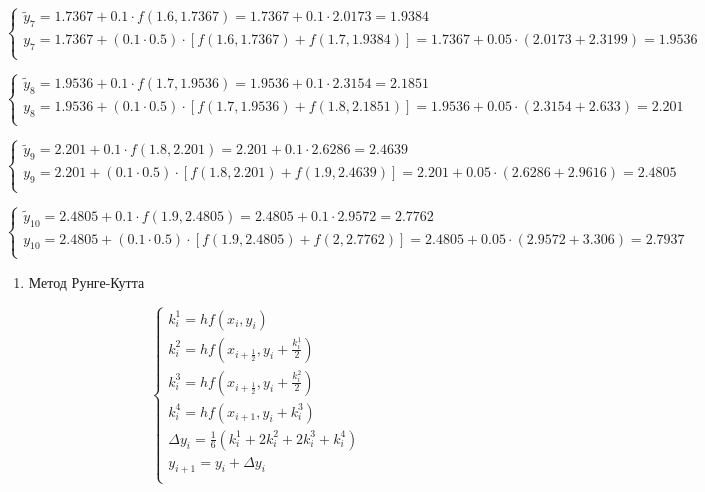 \documentclass[10pt, a4paper]{scrartcl}
\begin{document}
\(\displaystyle \begin{cases} \tilde{y}_{7} = 1.7367 + 0.1 \cdot f(1.6, 1.7367) = 1.7367 + 0.1 \cdot 2.0173 = 1.9384\\ y_{7} = 1.7367 + (0.1\cdot 0.5) \cdot [f(1.6, 1.7367) + f(1.7, 1.9384)] = 1.7367 + 0.05 \cdot (2.0173 + 2.3199) = 1.9536\\ \end{cases}\)

\(\displaystyle \begin{cases} \tilde{y}_{8} = 1.9536 + 0.1 \cdot f(1.7, 1.9536) = 1.9536 + 0.1 \cdot 2.3154 = 2.1851\\ y_{8} = 1.9536 + (0.1\cdot 0.5) \cdot [f(1.7, 1.9536) + f(1.8, 2.1851)] = 1.9536 + 0.05 \cdot (2.3154 + 2.633) = 2.201\\ \end{cases}\)

\(\displaystyle \begin{cases} \tilde{y}_{9} = 2.201 + 0.1 \cdot f(1.8, 2.201) = 2.201 + 0.1 \cdot 2.6286 = 2.4639\\ y_{9} = 2.201 + (0.1\cdot 0.5) \cdot [f(1.8, 2.201) + f(1.9, 2.4639)] = 2.201 + 0.05 \cdot (2.6286 + 2.9616) = 2.4805\\ \end{cases}\)

\(\displaystyle \begin{cases} \tilde{y}_{10} = 2.4805 + 0.1 \cdot f(1.9, 2.4805) = 2.4805 + 0.1 \cdot 2.9572 = 2.7762\\ y_{10} = 2.4805 + (0.1\cdot 0.5) \cdot [f(1.9, 2.4805) + f(2, 2.7762)] = 2.4805 + 0.05 \cdot (2.9572 + 3.306) = 2.7937\\ \end{cases}\)

\begin{enumerate}
\def\labelenumi{\arabic{enumi}.}
\setcounter{enumi}{2}
\itemsep1pt\parskip0pt
\item
  Метод Рунге-Кутта
\end{enumerate}

\[\begin{cases}
k_i^1 = h f(x_i, y_i)\\
k_i^2 = h f(x_{i+\frac{1}{2}}, y_i + \frac{k_i^1}{2})\\
k_i^3 = h f(x_{i+\frac{1}{2}}, y_i + \frac{k_i^2}{2})\\
k_i^4 = h f(x_{i+1}, y_i + k_i^3)\\
\Delta y_i = \frac{1}{6} (k_i^1 + 2k_i^2 + 2k_i^3 + k_i^4)\\
y_{i+1} = y_i + \Delta y_i\\
\end{cases}\]
\end{document}
